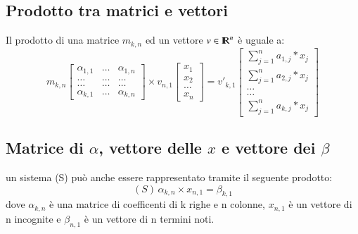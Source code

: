 \documentclass[12pt,a4paper]{article}
\theoremstyle{break}
\newcommand\R{{\rm I\!R}}
\begin{document}
    \subsection{Prodotto tra matrici e vettori}
    Il prodotto di una matrice $m_{k,n}$ ed un vettore $v\in\R^n$ è uguale a:
    \[ m_{k,n}
        \begin{bmatrix}
            \alpha_{1,1} & \dots & \alpha_{1,n} \\
            \dots & \dots & \dots \\
            \dots & \dots & \dots \\
            \alpha_{k,1} & \dots & \alpha_{k,n}
        \end{bmatrix}
        \times
        v_{n,1}
        \begin{bmatrix}
            x_1 \\
            x_2 \\
            \dots \\
            x_n
        \end{bmatrix}
        =
        v'_{k,1}
        \begin{bmatrix}
            \sum_{j=1}^{n} a_{1,j}*x_j \\
            \sum_{j=1}^{n} a_{2,j}*x_j \\
            \dots \\
            \dots \\
            \sum_{j=1}^n a_{k,j}*x_j
        \end{bmatrix}    
    \]
    \subsection{Matrice di $\alpha$, vettore delle $x$ e vettore dei $\beta$}
    un sistema (S) può anche essere rappresentato tramite il seguente prodotto:
    \[(S)\, \alpha_{k,n} \times x_{n,1} = \beta_{k,1}\]
    dove $\alpha_{k,n}$ è una matrice di coefficenti di k righe e n colonne, $x_{n,1}$ è un vettore di n incognite e $\beta_{n,1}$ è un vettore di n termini noti.
\end{document}
